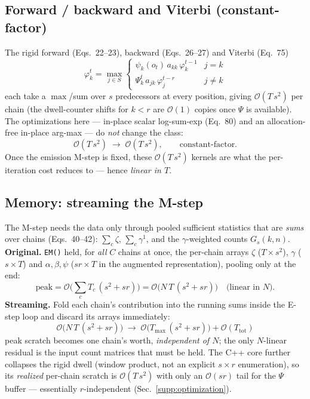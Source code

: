 \documentclass[11pt]{article}
\newcommand{\code}[1]{\texttt{#1}}
\newcommand{\bigO}{\mathcal{O}}
\begin{document}
\subsection{Forward / backward and Viterbi (constant-factor)}
The rigid forward (Eqs.~22--23), backward (Eqs.~26--27) and Viterbi (Eq.~75)
\begin{equation}
\varphi^{t}_k=\max_{j\in S}
\begin{cases}\psi_k(o_t)\,a_{kk}\,\varphi^{t-1}_k & j=k\\[2pt]
\Psi^{t}_k\,a_{jk}\,\varphi^{t-r}_j & j\ne k\end{cases}
\tag{75}
\end{equation}
each take a $\max$/sum over $s$ predecessors at every position, giving
$\bigO(T\,s^2)$ per chain (the dwell-counter shifts for $k<r$ are $\bigO(1)$ copies
once $\Psi$ is available). The optimizations here --- in-place scalar log-sum-exp
(Eq.~80) and an allocation-free in-place arg-max --- do \emph{not} change the class:
\[
\bigO(T\,s^2)\;\longrightarrow\;\bigO(T\,s^2),\qquad\text{constant-factor.}
\]
Once the emission M-step is fixed, these $\bigO(T\,s^2)$ kernels are what the
per-iteration cost reduces to --- hence \emph{linear in $T$}.

\subsection{Memory: streaming the M-step}
The M-step needs the data only through pooled sufficient statistics that are
\emph{sums} over chains (Eqs.~40--42): $\sum_c\zeta$, $\sum_c\gamma^{1}$, and the
$\gamma$-weighted counts $G_s(k,n)$.
\textbf{Original.} \code{EM()} held, for \emph{all} $C$ chains at once, the per-chain
arrays $\zeta$ ($T\!\times\!s^2$), $\gamma$ ($s\!\times\!T$) and $\alpha,\beta,\psi$
($s r\!\times\!T$ in the augmented representation), pooling only at the end:
\[
\text{peak} = \bigO\!\Big(\textstyle\sum_c T_c\,(s^2+s r)\Big)=\bigO\big(N\,T\,(s^2+s r)\big)\quad\text{(linear in $N$).}
\]
\textbf{Streaming.} Fold each chain's contribution into the running sums inside the
E-step loop and discard its arrays immediately:
\[
\boxed{\;\bigO\big(N\,T\,(s^2+s r)\big)\;\longrightarrow\;\bigO\big(T_{\max}\,(s^2+s r)\big)+\bigO(T_{\text{tot}})\;}
\]
peak scratch becomes one chain's worth, \emph{independent of $N$}; the only
$N$-linear residual is the input count matrices that must be held. The C++ core
further collapses the rigid dwell (window product, not an explicit $s\times r$
enumeration), so its \emph{realized} per-chain scratch is $\bigO(T\,s^2)$ with only an
$\bigO(s r)$ tail for the $\Psi$ buffer --- essentially $r$-independent
(Sec.~\ref{supp:optimization}).
\end{document}

